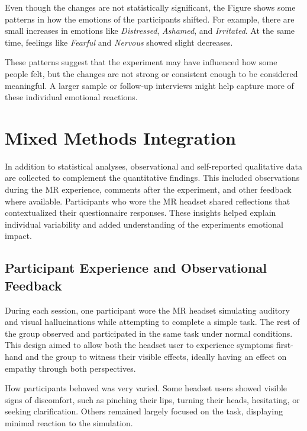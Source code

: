Even though the changes are not statistically significant, the Figure shows some patterns in how the emotions of the participants shifted. For example, there are small increases in emotions like \textit{Distressed}, \textit{Ashamed}, and \textit{Irritated}. At the same time, feelings like \textit{Fearful} and \textit{Nervous} showed slight decreases.

\vspace{1em}

These patterns suggest that the experiment may have influenced how some people felt, but the changes are not strong or consistent enough to be considered meaningful. A larger sample or follow-up interviews might help capture more of these individual emotional reactions.

\section{Mixed Methods Integration}
In addition to statistical analyses, observational and self-reported qualitative data are collected to complement the quantitative findings. This included observations during the MR experience, comments after the experiment, and other feedback where available. Participants who wore the MR headset shared reflections that contextualized their questionnaire responses. These insights helped explain individual variability and added understanding of the experiments emotional impact.


\subsection{Participant Experience and Observational Feedback}

During each session, one participant wore the MR headset simulating auditory and visual hallucinations while attempting to complete a simple task. The rest of the group observed and participated in the same task under normal conditions. This design aimed to allow both the headset user to experience symptoms first-hand and the group to witness their visible effects, ideally having an effect on empathy through both perspectives.

\vspace{1em}

How participants behaved was very varied. Some headset users showed visible signs of discomfort, such as pinching their lips, turning their heads, hesitating, or seeking clarification. Others remained largely focused on the task, displaying minimal reaction to the simulation.

